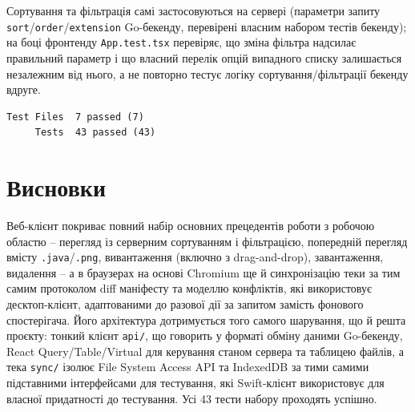 \documentclass[12pt,a4paper]{article}
\begin{document}
Сортування та фільтрація самі застосовуються на сервері (параметри запиту \texttt{sort}/\texttt{order}/\texttt{extension} Go-бекенду, перевірені власним набором тестів бекенду); на боці фронтенду \texttt{App.test.tsx} перевіряє, що зміна фільтра надсилає правильний параметр і що власний перелік опцій випадного списку залишається незалежним від нього, а не повторно тестує логіку сортування/фільтрації бекенду вдруге.

\begin{verbatim}
Test Files  7 passed (7)
     Tests  43 passed (43)
\end{verbatim}

\section{Висновки}

Веб-клієнт покриває повний набір основних прецедентів роботи з робочою областю -- перегляд із серверним сортуванням і фільтрацією, попередній перегляд вмісту \texttt{.java}/\texttt{.png}, вивантаження (включно з drag-and-drop), завантаження, видалення -- а в браузерах на основі Chromium ще й синхронізацію теки за тим самим протоколом diff маніфесту та моделлю конфліктів, які використовує десктоп-клієнт, адаптованими до разової дії за запитом замість фонового спостерігача. Його архітектура дотримується того самого шарування, що й решта проєкту: тонкий клієнт \texttt{api/}, що говорить у форматі обміну даними Go-бекенду, React Query/Table/Virtual для керування станом сервера та таблицею файлів, а тека \texttt{sync/} ізолює File System Access API та IndexedDB за тими самими підставними інтерфейсами для тестування, які Swift-клієнт використовує для власної придатності до тестування. Усі 43 тести набору проходять успішно.
\end{document}
